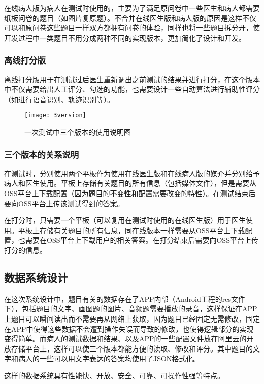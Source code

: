 在线病人版为病人在测试时使用的，主要为了满足原问卷中一些医生和病人都需要纸板问卷的题目（如图片复原题）。不合并在线医生版和病人版的原因是这样不仅可以和原问卷这些题目一样双方都拥有问卷的体验，同样也将一些题目拆分开，使开发过程中一类题目不用分成两种不同的实现版本，更加简化了设计和开发。

\subsubsection{离线打分版}

离线打分版用于在测试过后医生重新调出之前测试的结果并进行打分，在这个版本中不仅需要给出人工评分、勾选的功能，也需要设计一些自动算法进行辅助性评分（如进行语音识别、轨迹识别等）。

\begin{figure}[h]
  \centering
  \texttt{[image: 3version]}
  \caption{一次测试中三个版本的使用说明图}
\end{figure}

\subsubsection{三个版本的关系说明}

在测试时，分别使用两个平板作为使用在线医生版和在线病人版的媒介并分别给予病人和医生使用。平板上存储有关题目的所有信息（包括媒体文件），但是需要从OSS平台上下载配置（因为题目的不变性和配置需要改变的特性）。在测试结束后要向OSS平台上传该测试得到的答案。

在打分时，只需要一个平板（可以复用在测试时使用的在线医生版）用于医生使用。平板上存储有关题目的所有信息，同在线版本一样需要从OSS平台上下载配置，也需要在OSS平台上下载用户的相关答案。在打分结束后需要向OSS平台上传打分的信息。

\subsection{数据系统设计}

在这次系统设计中，题目有关的数据存在了APP内部（Android工程的res文件下），包括题目的文字、画图题的图片、音频题需要播放的录音，这样保证在APP上题目可以瞬间读出而不需要再从网络上获取，因为题目已经固定无需修改，固定在APP中使得这些数据不会遭到操作失误而导致的修改，也使得逻辑部分的实现变得简单。而病人的测试数据和结果、以及APP的一些配置文件放在阿里云的开放存储平台上，这样可以使三个版本都能方便的读取、修改和评分。其中题目的文字和病人的一些可以用文字表达的答案均使用了JSON格式化。

这样的数据系统具有性能快、开放、安全、可靠、可操作性强等特点。

